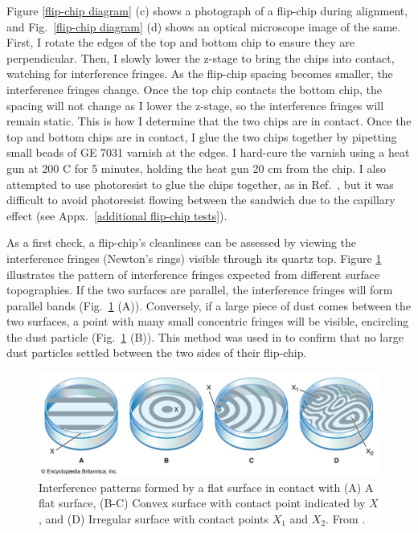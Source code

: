 \documentclass[double,12pt,1in,seploa]{beavtex}
\begin{document}
Figure \ref{flip-chip diagram} (c) shows a photograph of a flip-chip during alignment, and Fig.\ \ref{flip-chip diagram} (d) shows an optical microscope image of the same. First, I rotate the edges of the top and bottom chip to ensure they are perpendicular. Then, I slowly lower the z-stage to bring the chips into contact, watching for interference fringes. As the flip-chip spacing becomes smaller, the interference fringes change. Once the top chip contacts the bottom chip, the spacing will not change as I lower the z-stage, so the interference fringes will remain static. This is how I determine that the two chips are in contact. Once the top and bottom chips are in contact, I glue the two chips together by pipetting small beads of GE 7031 varnish at the edges. I hard-cure the varnish using a heat gun at 200 C for 5 minutes, holding the heat gun 20 cm from the chip. I also attempted to use photoresist to glue the chips together, as in Ref.\ \cite{beukman_noninvasive_2015}, but it was difficult to avoid photoresist flowing between the sandwich due to the capillary effect (see Appx.\ \ref{additional flip-chip tests}).

As a first check, a flip-chip's cleanliness can be assessed by viewing the interference fringes (Newton's rings) visible through its quartz top. Figure \ref{newtonsrings} illustrates the pattern of interference fringes expected from different surface topographies. If the two surfaces are parallel, the interference fringes will form parallel bands (Fig.\ \ref{newtonsrings} (A)). Conversely, if a large piece of dust comes between the two surfaces, a point with many small concentric fringes will be visible, encircling the dust particle (Fig.\ \ref{newtonsrings} (B)). This method was used in \cite{bennaceur_mechanical_2015} to confirm that no large dust particles settled between the two sides of their flip-chip.

\begin{figure}
    \includegraphics[width=1\textwidth]{newtonsrings.png}
    \caption{Interference patterns formed by a flat surface in contact with (A) A flat surface, (B-C) Convex surface with contact point indicated by $X$, and (D) Irregular surface with contact points $X_1$ and $X_2$.  From \cite{noauthor_newtons_nodate}.}
    \label{newtonsrings}
\end{figure}
\end{document}
